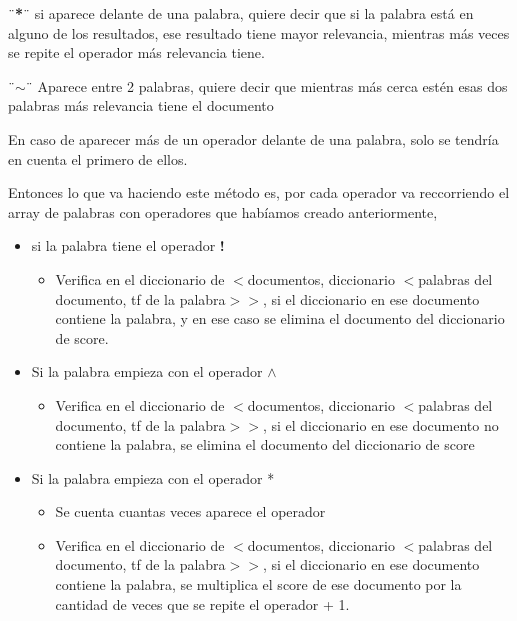 \documentclass[12pt, a4paper]{article}
\begin{document}
\begin{enumerate}
                        ¨\textbf{*}¨ si aparece delante de una palabra, quiere decir que si la palabra está
                        en alguno de los resultados, ese resultado tiene mayor relevancia,
                        mientras más veces se repite el operador más relevancia tiene.

                        ¨\textbf{$\sim$}¨ Aparece entre 2 palabras, quiere decir que mientras más cerca estén esas
                        dos palabras más relevancia tiene el documento

                        En caso de aparecer más de un operador delante de una palabra,
                        solo se tendría en cuenta el primero de ellos.
                        
                        Entonces lo que va haciendo este método es, por cada operador va reccorriendo
                        el array de palabras con operadores que habíamos creado anteriormente,
                        
                  \begin{itemize}
                        \item si la palabra tiene el operador \textbf{!}
                        \begin{itemize}
                        \item  Verifica en el diccionario de
                        $<$documentos, diccionario $<$palabras del documento, tf de la palabra$>>$,
                        si el diccionario en ese documento contiene la palabra, y en ese caso
                        se elimina el documento del diccionario de score.
                        \end{itemize}
                  \item Si la palabra empieza con el operador \textbf{$\wedge$}
                        \begin{itemize}
                  \item Verifica en el diccionario de
                        $<$documentos, diccionario $<$palabras del documento, tf de la palabra$>>$,
                        si el diccionario en ese documento no contiene la palabra,
                        se elimina el documento del diccionario de score
                  \end{itemize}

                  \newpage
                  \item Si la palabra empieza con el operador *
                  \begin{itemize}
                  \item Se cuenta cuantas veces aparece el operador
                  \item Verifica en el diccionario de
                        $<$documentos, diccionario $<$palabras del documento, tf de la palabra$>>$,
                        si el diccionario en ese documento contiene la palabra,
                        se multiplica el score de ese documento por la cantidad de veces que
                        se repite el operador + 1.
                  \end{itemize}


\end{itemize}
\end{enumerate}
\end{document}
